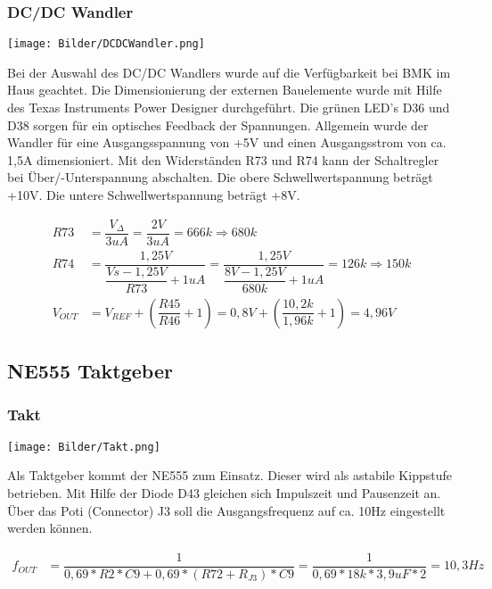 \documentclass[a4paper,11pt]{scrartcl}
\begin{document}
\subsubsection{DC/DC Wandler}

\begin{center}
\texttt{[image: Bilder/DCDCWandler.png]}
\end{center}

Bei der Auswahl des DC/DC Wandlers wurde auf die Verfügbarkeit bei BMK im Haus geachtet. Die Dimensionierung der externen Bauelemente wurde mit Hilfe des \glqq Texas Instruments Power Designer \grqq{} durchgeführt. Die grünen LED's D36 und D38 sorgen für ein optisches Feedback der Spannungen. Allgemein wurde der Wandler für eine Ausgangsspannung von +5V und einen Ausgangsstrom von ca. 1,5A dimensioniert. Mit den Widerständen R73 und R74 kann der Schaltregler bei Über/-Unterspannung abschalten. Die obere Schwellwertspannung beträgt +10V. Die untere Schwellwertspannung beträgt +8V.

\begin{align}
	R73 &= \dfrac{V_{\Delta}}{3uA} = \dfrac{2V}{3uA} = 666k  \Rightarrow 680k\\
	R74 &= \dfrac{1,25V}{\dfrac{Vs - 1,25V}{R73} + 1uA} = \dfrac{1,25V}{\dfrac{8V - 1,25V}{680k} + 1uA} = 126k \Rightarrow 150k	\\
	V_{OUT}	&= V_{REF} + (\dfrac{R45}{R46} + 1) = 0,8V + (\dfrac{10,2k}{1,96k} + 1) = 4,96V
\end{align}

\newpage


\subsection{NE555 Taktgeber}

\subsubsection{Takt}

\begin{center}
\texttt{[image: Bilder/Takt.png]}
\end{center}

Als Taktgeber kommt der \glqq NE555 \grqq{} zum Einsatz. Dieser wird als astabile Kippstufe betrieben. Mit Hilfe der Diode D43 gleichen sich Impulszeit und Pausenzeit an. Über das Poti (Connector) J3 soll die Ausgangsfrequenz auf ca. 10Hz eingestellt werden können. 

\begin{align}
	f_{OUT} &= \dfrac{1}{0,69*R2*C9 + 0,69*(R72+R_{J3})* C9} = \dfrac{1}{0,69*18k*3,9uF*2} = 10,3Hz
\end{align} 
\end{document}
